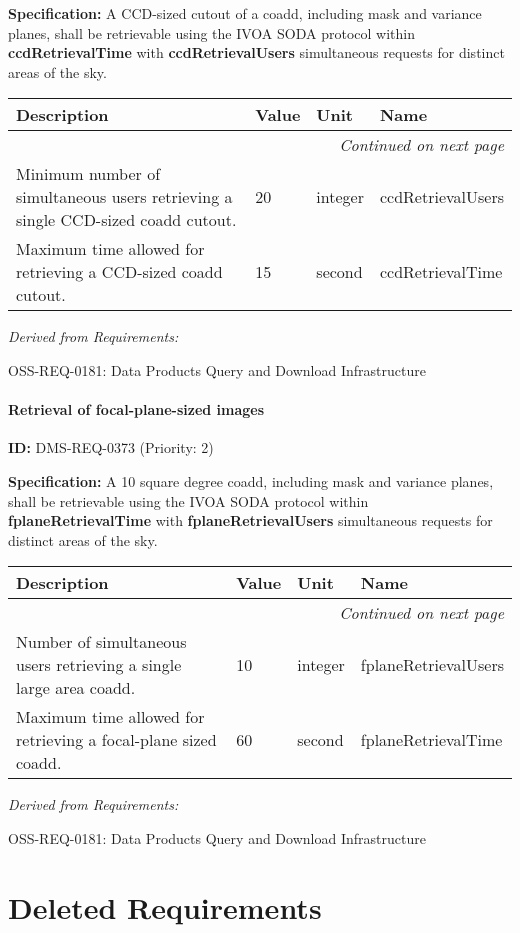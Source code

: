 \documentclass[SE,toc,lsstdraft]{lsstdoc}
\makeatletter
\newcommand{\paramname}[1]{\hspace{0pt}#1}
\newcommand{\unitname}[1]{\hspace{0pt}#1}
\newenvironment{parameters}[0]{%
\setlength\LTleft{0pt}
\setlength\LTright{\fill}
\begin{small}
\begin{longtable}[]{|p{0.49\textwidth}|l|p{0.6in}|p{1.70in}@{}|}

\hline \textbf{Description} & \textbf{Value} & \textbf{Unit} & \textbf{Name} \\ \hline
\endhead

\hline \multicolumn{4}{r}{\emph{Continued on next page}} \\
\endfoot

\hline\hline
\endlastfoot
}{%
\hline
\end{longtable}
\end{small}
}
\makeatother
\begin{document}
\textbf{Specification:}
A CCD-sized cutout of a coadd, including mask and variance planes, shall be retrievable using the IVOA SODA protocol within \textbf{ccdRetrievalTime} with \textbf{ccdRetrievalUsers} simultaneous requests for distinct areas of the sky.

\begin{parameters}
Minimum number of simultaneous users retrieving a single CCD-sized coadd cutout.
&
20
&
\unitname{%
integer
}
&
\paramname{%
ccdRetrievalUsers
} \\\hline
Maximum time allowed for retrieving a CCD-sized coadd cutout.
&
15
&
\unitname{%
second
}
&
\paramname{%
ccdRetrievalTime
} \\\hline
\end{parameters}

\emph{Derived from Requirements:}

OSS-REQ-0181:
Data Products Query and Download Infrastructure \newline

\paragraph{Retrieval of focal-plane-sized images}\hfill  %

\label{DMS-REQ-0373}
\textbf{ID:} DMS-REQ-0373 (Priority: 2)

\textbf{Specification:}
A 10 square degree coadd, including mask and variance planes, shall be retrievable using the IVOA SODA protocol within \textbf{fplaneRetrievalTime} with \textbf{fplaneRetrievalUsers} simultaneous requests for distinct areas of the sky.

\begin{parameters}
Number of simultaneous users retrieving a single large area coadd.
&
10
&
\unitname{%
integer
}
&
\paramname{%
fplaneRetrievalUsers
} \\\hline
Maximum time allowed for retrieving a focal-plane sized coadd.
&
60
&
\unitname{%
second
}
&
\paramname{%
fplaneRetrievalTime
} \\\hline
\end{parameters}

\emph{Derived from Requirements:}

OSS-REQ-0181:
Data Products Query and Download Infrastructure \newline

\section{Deleted Requirements}
\end{document}
